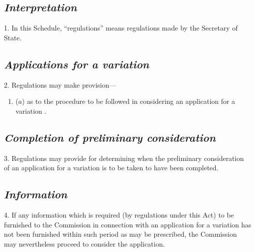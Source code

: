 \documentclass[12pt,a4paper]{article}
\begin{document}

\subsection*{\itshape Interpretation}

1. In this Schedule, “regulations” means regulations made by the Secretary of State.

\subsection*{\itshape Applications for a variation}

2. Regulations may make provision—
\begin{enumerate}\item[]
($a$) as to the procedure to be followed in considering an application for a variation%
%
.
\end{enumerate}


\subsection*{\itshape Completion of preliminary consideration}

3. Regulations may provide for determining when the preliminary consideration of an application for a variation is to be taken to have been completed.

\subsection*{\itshape Information}

4. If any information which is required (by regulations under this Act) to be furnished to the 
Commission  %
in connection with an application for a variation has not been furnished within such period as may be prescribed, the 
Commission  %
may nevertheless proceed to consider the application.
\end{document}
